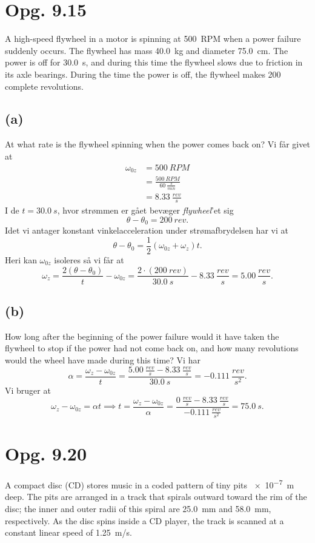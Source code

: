 \documentclass[12pt]{article}
\begin{document}
\section*{Opg. 9.15}
A high-speed flywheel in a motor is spinning at \qty{500}{RPM} when a power failure suddenly occurs. The flywheel has mass \qty{40,0}{kg} and diameter \qty{75,0}{cm}. The power is off for \qty{30,0}{s}, and during this time the flywheel slows due to friction in its axle bearings. During the time the power is off, the flywheel makes 200 complete revolutions.


\subsection*{(a)}
At what rate is the flywheel spinning when the power comes back on?
\bigbreak
Vi får givet at
\begin{align*}
  \omega_{0z} &= \qty{500}{RPM} \\
  &= \frac{\qty{500}{RPM}}{\qty{60}{\frac{s}{min}}} \\
  &= \qty{8,33}{\frac{rev}{s}}
\end{align*}
I de $t = \qty{30,0}{s}$, hvor strømmen er gået bevæger \textit{flywheel}'et sig
\[
\theta - \theta_0 = \qty{200}{rev}
.\] 
Idet vi antager konstant vinkelacceleration under strømafbrydelsen har vi at
\[
  \theta - \theta_0 = \frac{1}{2}\left( \omega_{0z} + \omega_z \right)t
.\] 
Heri kan $\omega_{0z}$ isoleres så vi får at
\[
\omega_{z} = \frac{2\left( \theta - \theta_{0} \right)}{t} - \omega_{0z} = \frac{2\cdot \left( \qty{200}{rev} \right)}{\qty{30,0}{s}} - \qty{8,33}{\frac{rev}{s}} = \qty{5,00}{\frac{rev}{s}} 
.\] 

\subsection*{(b)}
How long after the beginning of the power failure would it have taken the flywheel to stop if the power had not come back on, and how many revolutions would the wheel have made during this time?
\bigbreak
Vi har
\[
\alpha = \frac{\omega_z - \omega_{0z}}{t} = \frac{\qty{5,00}{\frac{rev}{s} - \qty{8,33}{\frac{rev}{s}}}}{\qty{30,0}{s}} = \qty{-0,111}{\frac{rev}{s^2}}
.\] 
Vi bruger at
\[
\omega_z  - \omega_{0z} = \alpha t \implies t = \frac{\omega_z - \omega_{0z}}{\alpha} = \frac{\qty{0}{\frac{rev}{s}} - \qty{8,33}{\frac{rev}{s}}}{\qty{-0,111}{\frac{rev}{s^2}}} = \qty{75,0}{s}
.\] 


\section*{Opg. 9.20}
A compact disc (CD) stores music in a coded pattern of tiny pits \qty{e-7}{m} deep. The pits are arranged in a track that spirals outward toward the rim of the disc; the inner and outer radii of this spiral are \qty{25,0}{mm} and \qty{58,0}{mm}, respectively. As the disc spins inside a CD player, the track is scanned at a constant linear speed of \qty{1,25}{m/s}.
\end{document}
